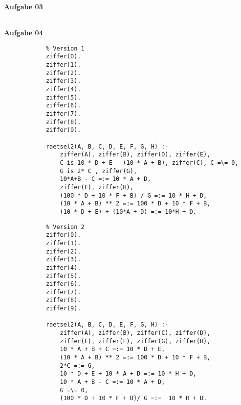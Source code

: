 \documentclass[a4paper,10pt]{article}
\begin{document}
	\newpage
	\textbf{Aufgabe 03}
	\begin{compactenum} [(a)]
		\item
		\item 
		\item 
		\item 
	\end{compactenum}\ \\

	\textbf{Aufgabe 04}
	\begin{compactenum} [(a)]
		\item \begin{compactenum} [(V 1)]
			\item 
			\begin{verbatim}
			% Version 1
			ziffer(0).
			ziffer(1).
			ziffer(2).
			ziffer(3).
			ziffer(4).
			ziffer(5).
			ziffer(6).
			ziffer(7).
			ziffer(8).
			ziffer(9).
			
			raetsel2(A, B, C, D, E, F, G, H) :-
				ziffer(A), ziffer(B), ziffer(D), ziffer(E),
				C is 10 * D + E - (10 * A + B), ziffer(C), C =\= 0,
				G is 2* C , ziffer(G),
				10*A+B - C =:= 10 * A + D,
				ziffer(F), ziffer(H),
				(100 * D + 10 * F + B) / G =:= 10 * H + D,
				(10 * A + B) ** 2 =:= 100 * D + 10 * F + B,
				(10 * D + E) + (10*A + D) =:= 10*H + D.
			\end{verbatim}
			\item 
			\begin{verbatim}
			% Version 2
			ziffer(0).
			ziffer(1).
			ziffer(2).
			ziffer(3).
			ziffer(4).
			ziffer(5).
			ziffer(6).
			ziffer(7).
			ziffer(8).
			ziffer(9).
			
			raetsel2(A, B, C, D, E, F, G, H) :-
				ziffer(A), ziffer(B), ziffer(C), ziffer(D),
				ziffer(E), ziffer(F), ziffer(G), ziffer(H),
				10 * A + B + C =:= 10 * D + E,
				(10 * A + B) ** 2 =:= 100 * D + 10 * F + B,
				2*C =:= G,
				10 * D + E + 10 * A + D =:= 10 * H + D,
				10 * A + B - C =:= 10 * A + D,
				G =\= 0,
				(100 * D + 10 * F + B)/ G =:=  10 * H + D.
			\end{verbatim}
		\end{compactenum}\
		\item 
		\begin{verbatim}
		
		\end{verbatim}
	\end{compactenum}
\end{document}
